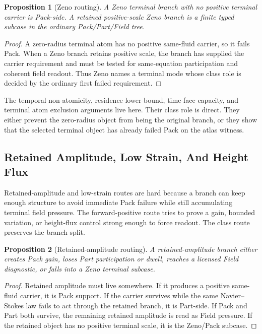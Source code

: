 \documentclass[11pt]{article}
\newtheorem{proposition}{Proposition}
\begin{document}
\begin{proposition}[Zeno routing]
A Zeno terminal branch with no positive terminal carrier is Pack-side.
A retained positive-scale Zeno branch is a finite typed subcase in the ordinary Pack/Part/Field tree.
\end{proposition}

\begin{proof}
A zero-radius terminal atom has no positive same-fluid carrier, so it fails Pack.
When a Zeno branch retains positive scale, the branch has supplied the carrier requirement and must be tested for same-equation participation and coherent field readout.
Thus Zeno names a terminal mode whose class role is decided by the ordinary first failed requirement.
\end{proof}

The temporal non-atomicity, residence lower-bound, time-face capacity, and terminal atom exclusion arguments live here.
Their class role is direct.
They either prevent the zero-radius object from being the original branch, or they show that the selected terminal object has already failed Pack on the atlas witness.

\subsection{Retained Amplitude, Low Strain, And Height Flux}

Retained-amplitude and low-strain routes are hard because a branch can keep enough structure to avoid immediate Pack failure while still accumulating terminal field pressure.
The forward-positive route tries to prove a gain, bounded variation, or height-flux control strong enough to force readout.
The class route preserves the branch split.

\begin{proposition}[Retained-amplitude routing]
A retained-amplitude branch either creates Pack gain, loses Part participation or dwell, reaches a licensed Field diagnostic, or falls into a Zeno terminal subcase.
\end{proposition}

\begin{proof}
Retained amplitude must live somewhere.
If it produces a positive same-fluid carrier, it is Pack support.
If the carrier survives while the same Navier--Stokes law fails to act through the retained branch, it is Part-side.
If Pack and Part both survive, the remaining retained amplitude is read as Field pressure.
If the retained object has no positive terminal scale, it is the Zeno/Pack subcase.
\end{proof}
\end{document}
